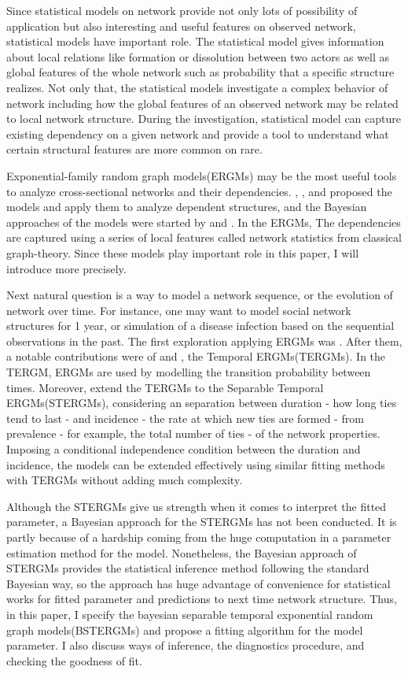 \documentclass[aspectratio=169,ignorenonframetext,9pt]{beamer}
\theoremstyle{plain}
\theoremstyle{definition}
\begin{document}
Since statistical models on network provide not only lots of possibility of application but also
interesting and useful features on observed network, statistical models have important role.
The statistical model gives information about local relations like formation or dissolution between
two actors as well as global features of the whole network such as probability that a specific structure
realizes. Not only that, the statistical models investigate a complex behavior of network including
how the global features of an observed network may be related to local network structure.
During the investigation, statistical model can capture existing dependency on a given network
and provide a tool to understand what certain structural features are more common on rare.

Exponential-family random graph models(ERGMs) may be the most useful tools to analyze cross-sectional networks and their dependencies.
\cite{RN117}, \cite{RN123}, \cite{RN124} and \cite{RN122} proposed the models and apply them to analyze dependent structures,
and the Bayesian approaches of the models were started by \cite{RN115} and \cite{RN116}.
In the ERGMs, The dependencies are captured using a series of local features called network statistics from classical graph-theory.
Since these models play important role in this paper, I will introduce more precisely.

Next natural question is a way to model a network sequence, or the evolution of network over time.
For instance, one may want to model social network structures for 1 year, or
simulation of a disease infection based on the sequential observations in the past.
The first exploration applying ERGMs was \cite{RN109}. 
After them, a notable contributions were of \cite{RN125} and \cite{RN126}, the Temporal ERGMs(TERGMs).
In the TERGM, ERGMs are used by modelling the transition probability between times.
Moreover, \cite{RN93} extend the TERGMs to the Separable Temporal ERGMs(STERGMs), considering an
separation between duration - how long ties tend to last - and incidence - the rate at which new ties are formed -
from prevalence - for example, the total number of ties - of the network properties.
Imposing a conditional independence condition between the duration and incidence,
the models can be extended effectively using similar fitting methods with TERGMs
without adding much complexity.

Although the STERGMs give us strength when it comes to interpret the fitted parameter,
a Bayesian approach for the STERGMs has not been conducted. It is partly because of a hardship
coming from the huge computation in a parameter estimation method for the model.
Nonetheless, the Bayesian approach of STERGMs provides the statistical inference method
following the standard Bayesian way, so the approach has huge advantage of convenience
for statistical works for fitted parameter and predictions to next time network structure.
Thus, in this paper, I specify the bayesian separable temporal exponential random graph models(BSTERGMs)
and propose a fitting algorithm for the model parameter. 
I also discuss ways of inference, the diagnostics procedure, and checking the goodness of fit.
\end{document}
